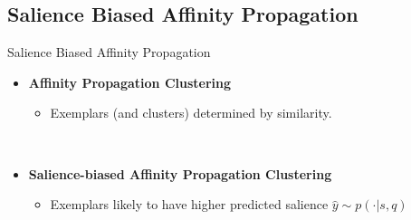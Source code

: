 \subsection{Salience Biased Affinity Propagation}
\begin{frame}{Salience Biased Affinity Propagation}
    \center

    \begin{itemize}
        \item \textbf{Affinity Propagation Clustering} 
            \begin{itemize}
                \item Exemplars (and clusters) determined by similarity. 
            \end{itemize}
            ~\\
        \item<2> \textbf{Salience-biased Affinity Propagation Clustering}
            \begin{itemize}
                \item Exemplars likely to have higher predicted salience $\hat{y} \sim p(\cdot|s, q)$ 
            \end{itemize}
    \end{itemize}

\end{frame}
